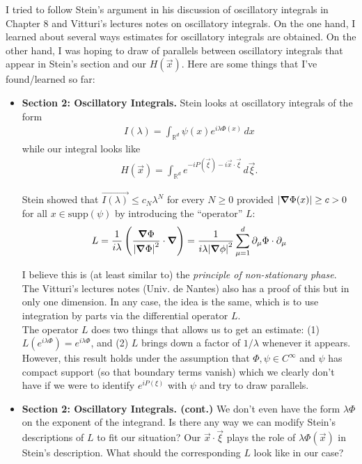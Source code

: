 \documentclass{article}
\theoremstyle{definition}
\newcommand{\p}{\partial}
\newcommand{\f}[2]{\frac{#1}{#2}}
\newcommand{\lp}{\left(}
\newcommand{\rp}{\right)}
\begin{document}
\noindent I tried to follow Stein's argument in his discussion of oscillatory integrals in Chapter 8 and Vitturi's lectures notes on oscillatory integrals. On the one hand, I learned about several ways estimates for oscillatory integrals are obtained. On the other hand, I was hoping to draw of parallels between oscillatory integrals that appear in Stein's section and our $H(\vec{x})$. Here are some things that I've found/learned so far:
\begin{itemize}
    \item \textbf{Section 2: Oscillatory Integrals.} Stein looks at oscillatory integrals of the form
    \begin{align*}
    I(\lambda) = \int_{\mathbb{R}^d} \psi(x)e^{i\lambda \Phi(x)}\,dx
    \end{align*}
    while our integral looks like
    \begin{align*}
        H(\vec{x})  = \int_{\mathbb{R}^d} e^{-i P(\vec{\xi}) - i \vec{x} \cdot \vec{\xi}}\,d\vec{\xi}.
    \end{align*}
    
    Stein showed that $\vec{I(\lambda)} \leq c_N \lambda^N$ for every $N \geq 0$ provided $\abs{\grad \Phi(x)} \geq c > 0$ for all $x \in \text{supp}(\psi)$ by introducing the ``operator'' $L$:
    \begin{align*}
        L = \f{1}{i\lambda} \lp \f{\grad\Phi}{\abs{\grad \Phi}^2} \cdot \grad\rp = \f{1}{i\lambda\abs{\grad\phi}^2}\sum^d_{\mu=1} \p_\mu \Phi \cdot \p_\mu
    \end{align*}
    
    I believe this is (at least similar to) the \textit{principle of non-stationary phase}. The Vitturi's lectures notes (Univ. de Nantes) also has a proof of this but in only one dimension. In any case, the idea is the same, which is to use integration by parts via the differential operator $L$. \\
    
    
    The operator $L$ does two things that allows us to get an estimate: (1) $L(e^{i\lambda \Phi}) = e^{i\lambda \Phi}$, and (2) $L$ brings down a factor of $1/\lambda$ whenever it appears. However, this result holds under the assumption that $\Phi, \psi \in C^\infty$ and $\psi$ has compact support (so that boundary terms vanish) which we clearly don't have if we were to identify $e^{iP(\xi)}$ with $\psi$ and try to draw parallels. 
    
    
    
    \item \textbf{Section 2: Oscillatory Integrals. (cont.)} We don't even have the form $\lambda \Phi$ on the exponent of the integrand. Is there any way we can modify Stein's descriptions of $L$ to fit our situation? Our $\vec{x}\cdot \vec{\xi}$ plays the role of $\lambda \Phi(\vec{x})$ in Stein's description. What should the corresponding $L$ look like in our case?
    

\end{itemize}
\end{document}
